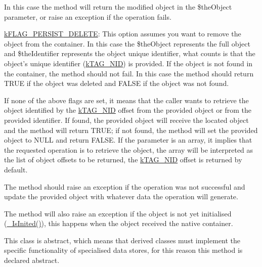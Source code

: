 \begin{DoxyItemize}
\begin{DoxyItemize}
\begin{DoxyItemize}
\end{DoxyItemize}In this case the method will return the modified object in the {\ttfamily \$the\-Object} parameter, or raise an exception if the operation fails. 
\item \hyperlink{}{k\-F\-L\-A\-G\-\_\-\-P\-E\-R\-S\-I\-S\-T\-\_\-\-D\-E\-L\-E\-T\-E}\-: This option assumes you want to remove the object from the container. In this case the {\ttfamily \$the\-Object} represents the full object and {\ttfamily \$the\-Identifier} represents the object unique identifier, what counts is that the object's unique identifier (\hyperlink{}{k\-T\-A\-G\-\_\-\-N\-I\-D}) is provided. If the object is not found in the container, the method should not fail. In this case the method should return {\ttfamily T\-R\-U\-E} if the object was deleted and {\ttfamily F\-A\-L\-S\-E} if the object was not found. 
\end{DoxyItemize}If none of the above flags are set, it means that the caller wants to retrieve the object identified by the \hyperlink{}{k\-T\-A\-G\-\_\-\-N\-I\-D} offset from the provided object or from the provided identifier. If found, the provided object will receive the located object and the method will return {\ttfamily T\-R\-U\-E}; if not found, the method will set the provided object to {\ttfamily N\-U\-L\-L} and return {\ttfamily F\-A\-L\-S\-E}. If the parameter is an array, it implies that the requested operation is to retrieve the object, the array will be interpreted as the list of object offsets to be returned, the \hyperlink{}{k\-T\-A\-G\-\_\-\-N\-I\-D} offset is returned by default. 
\end{DoxyItemize}

The method should raise an exception if the operation was not successful and update the provided object with whatever data the operation will generate.

The method will also raise an exception if the object is not yet initialised (\hyperlink{class_c_status_document_a954dee06e219e0a0f2e7fa6edac56e28}{\-\_\-\-Is\-Inited()}), this happens when the object received the native container.

This class is abstract, which means that derived classes must implement the specific functionality of specialised data stores, for this reason this method is declared abstract.



